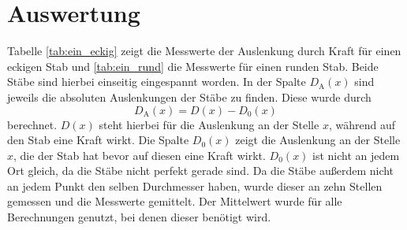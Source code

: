 \section{Auswertung}
\label{sec:Auswertung}
Tabelle \ref{tab:ein_eckig} zeigt die Messwerte der Auslenkung durch Kraft für einen eckigen Stab und \ref{tab:ein_rund} die Messwerte für einen runden Stab.
Beide Stäbe sind hierbei einseitig eingespannt worden.
In der Spalte $D_\text{A}(x)$ sind jeweils die absoluten Auslenkungen der Stäbe zu finden.
Diese wurde durch
\begin{equation}
    D_\text{A}(x) = D(x) - D_0(x)
    \label{eqn:Da}
\end{equation}
berechnet.
$D(x)$ steht hierbei für die Auslenkung an der Stelle $x$, während auf den Stab eine Kraft wirkt.
Die Spalte $D_0(x)$ zeigt die Auslenkung an der Stelle $x$, die der Stab hat bevor auf diesen eine Kraft wirkt.
$D_0(x)$ ist nicht an jedem Ort gleich, da die Stäbe nicht perfekt gerade sind.
Da die Stäbe außerdem nicht an jedem Punkt den selben Durchmesser haben, wurde dieser an zehn Stellen gemessen und die Messwerte gemittelt.
Der Mittelwert wurde für alle Berechnungen genutzt, bei denen dieser benötigt wird.

